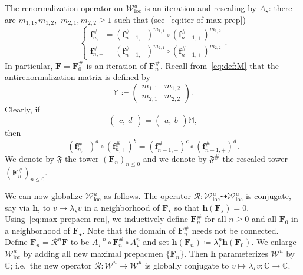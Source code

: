 \documentclass{amsart}
\newcommand{\1}{{\mathbb 1 }}
\newcommand\M{\mathbb M}
\newcommand\RR{\mathcal{R}}
\newcommand{\bF}{{\mathbf F}}
\newcommand{\tF}{{\mathfrak F}}
\newcommand{\bbf}{{\mathbf f}}
\newcommand{\bbh}{{\mathbf h}}
\newcommand{\str}{{\star}}
\def\loc{{\mathrm{loc}}}
\newcommand\Unst{{\boldsymbol{\mathcal{W}}^u}}
\newcommand\UnstLoc{{\boldsymbol{\mathcal{W}}^u_\loc}}
\newcommand{\C}{\mathbb{C}}
\theoremstyle{remark}
\numberwithin{equation}{section}
\theoremstyle{definition}
\theoremstyle{nonumberbreak}
\begin{document}
The renormalization operator on $\UnstLoc$ is an iteration and rescaling by $A_\str$: there are $m_{1,1},m_{1,2},$ $m_{2,1},m_{2,2}\ge 1$ such that (see~\eqref{eq:iter of max prep})
\begin{equation}
\label{eq:ff_n:ff_n-1}
\left\{\begin{array}{c}
\bbf^\#_{n,-}=\left( \bbf^\#_{n-1,-}\right)^{m_{1,1}}\circ \left( \bbf^\#_{n-1,+}\right)^{m_{1,2}}\\
\bbf^\#_{n,+}=\left( \bbf^\#_{n-1,-}\right)^{m_{2,1}}\circ \left( \bbf^\#_{n-1,+}\right)^{m_{2,2}}
\end{array}\right..
\end{equation}
In particular, $\bF=\bF_0^\#$ is an iteration of $\bF_n^\#$. Recall from~\eqref{eq:def:M} that the antirenormalization matrix is defined by
\begin{equation}
\label{eq:def:M:2}
\M\coloneqq \left(\begin{matrix}
         m_{1,1} &m_{1,2} \\ m_{2,1} &m_{2,2}
        \end{matrix}\right).
\end{equation}
Clearly, if
\begin{equation}
\label{eq:relat on triples}
\left(\begin{matrix}
         c,\ d
        \end{matrix}\right) = \left(\begin{matrix}
          a,\ b
        \end{matrix}\right)\M, 
\end{equation} 
then 
\begin{equation}
\label{eq:max prepacm ren}
\left( \bbf^\#_{n,-}\right)^a\circ \left( \bbf^\#_{n,+}\right)^b= \left( \bbf^\#_{n-1,-}\right)^{c}\circ \left( \bbf^\#_{n-1,+}\right)^{d}.
\end{equation}
We denote by $\tF$ the tower $(\bF_n)_{n\le 0}$ and we denote by $\tF^{\#}$ the rescaled tower $(\bF^{\#}_n)_{n\le 0}$. 


We can now globalize $\UnstLoc$ as follows. The operator $\RR\colon \UnstLoc \dashrightarrow \UnstLoc$ is conjugate, say via $\bbh$, to $v\mapsto \lambda_\str v$ in a neighborhood of $\bF_\str$ so that $\bbh(\bF_\str)=0$. Using~\eqref{eq:max prepacm ren}, we inductively define $\bF_n^\#$ for all $n\ge 0$ and all $\bF_0$ in a neighborhood of $\bF_\str$. Note that the domain of $\bF_n^\#$  needs not be connected. Define $\bF_n=\RR^n \bF$ to be $A_\str^{-n}\circ \bF_n^\# \circ A_\str^{n} $ and set $\bbh(\bF_n)\coloneqq \lambda_\str^n \bbh(\bF_0)$. We enlarge $\UnstLoc$ by adding all new maximal prepacmen $\{\bF_n\}$. Then $\bbh$ parameterizes $\Unst$ by $\C$; i.e.~the new operator $\RR\colon \Unst\to\Unst $ is globally conjugate to $v\mapsto \lambda_\str v\colon \C\to \C$.
\end{document}
